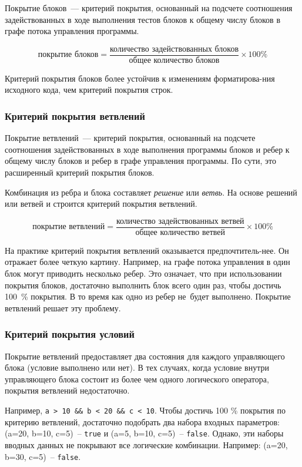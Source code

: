 Покрытие блоков~--- критерий покрытия, основанный на подсчете соотношения задействованных в ходе выполнения тестов блоков к общему числу блоков в графе потока управления программы.

\[ \text{покрытие блоков} = \frac{\text{количество задействованных блоков}}{\text{общее количество блоков}}  \times 100 \% \]

Критерий покрытия блоков более устойчив к изменениям форматирова-ния исходного кода, чем критерий покрытия строк.


\subsubsection{Критерий покрытия ветвлений}

Покрытие ветвлений~--- критерий покрытия, основанный на подсчете соотношения задействованных в ходе выполнения программы блоков и ребер к общему числу блоков и ребер в графе управления программы. По сути, это расширенный критерий покрытия блоков. 


Комбинация из ребра и блока составляет \textit{решение} или \textit{ветвь}. На основе решений или ветвей и строится критерий покрытия ветвлений.

\[ \text{покрытие ветвлений} = \frac{\text{количество задействованных ветвей}}{\text{общее количество ветвей}}  \times 100 \% \]


На практике критерий покрытия ветвлений оказывается предпочтитель-нее. Он отражает более четкую картину. Например, на графе потока управления в один блок могут приводить несколько ребер. Это означает, что при использовании покрытия блоков, достаточно выполнить блок всего один раз, чтобы достичь 100~\% покрытия. В то время как одно из ребер не~будет выполнено. Покрытие ветвлений решает эту проблему.

\subsubsection{Критерий покрытия условий}

Покрытие ветвлений предоставляет два состояния для каждого управляющего блока (условие выполнено или нет). В тех случаях, когда условие внутри управляющего блока состоит из более чем одного логического оператора, покрытия ветвлений недостаточно. 

Например, \texttt{a > 10 \&\& b < 20 \&\& c < 10}. Чтобы достичь 100 \% покрытия по критерию ветвлений, достаточно подобрать два набора входных параметров: (a=20, b=10, c=5)~-- \texttt{true} и (a=5, b=10, c=5)~-- \texttt{false}. Однако, эти наборы вводных данных не покрывают все логические комбинации. Например: (a=20, b=30, c=5)~-- \texttt{false}.

